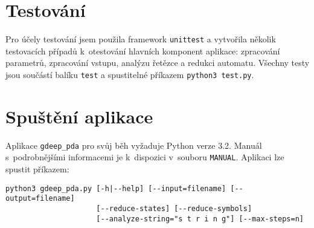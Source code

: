 \section{Testování}

Pro účely testování jsem použila framework \texttt{unittest} a vytvořila několik testovacích případů k~otestování hlavních komponent aplikace: zpracování parametrů, zpracování vstupu, analýzu řetězce a redukci automatu. Všechny testy jsou součástí balíku \texttt{test} a spustitelné příkazem \texttt{python3 test.py}.

\section{Spuštění aplikace}

Aplikace \texttt{gdeep\_pda} pro svůj běh vyžaduje Python verze 3.2. Manuál s~podrobnějšími informacemi je k~dispozici v~souboru \texttt{MANUAL}. Aplikaci lze spustit příkazem:

\begin{verbatim}
python3 gdeep_pda.py [-h|--help] [--input=filename] [--output=filename] 
                     [--reduce-states] [--reduce-symbols] 
                     [--analyze-string="s t r i n g"] [--max-steps=n]
\end{verbatim} 










